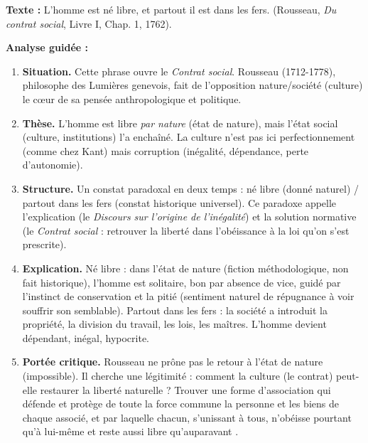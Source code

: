 \documentclass[11pt]{article}
\newcommand{\cle}[1]{{\popxbold\color{popdark}#1}}
\begin{document}
\begin{experience}
\textbf{Texte :} \guillemotleft L'homme est né libre, et partout il est dans les fers. \guillemotright (Rousseau, \emph{Du contrat social}, Livre I, Chap. 1, 1762).

\textbf{Analyse guidée :}
\begin{enumerate}
\item \textbf{Situation.} Cette phrase ouvre le \emph{Contrat social}. Rousseau (1712-1778), philosophe des Lumières genevois, fait de l'opposition nature/société (culture) le cœur de sa pensée anthropologique et politique.
\item \textbf{Thèse.} L'homme est libre \emph{par nature} (état de nature), mais l'état social (culture, institutions) l'a enchaîné. La culture n'est pas ici \guillemotleft perfectionnement \guillemotright (comme chez Kant) mais \guillemotleft corruption \guillemotright (inégalité, dépendance, perte d'autonomie).
\item \textbf{Structure.} Un constat paradoxal en deux temps : \guillemotleft né libre \guillemotright (donné naturel) / \guillemotleft partout dans les fers \guillemotright (constat historique universel). Ce paradoxe appelle l'explication (le \emph{Discours sur l'origine de l'inégalité}) et la solution normative (le \emph{Contrat social} : retrouver la liberté dans l'obéissance à la loi qu'on s'est prescrite).
\item \textbf{Explication.} \guillemotleft Né libre \guillemotright : dans l'état de nature (fiction méthodologique, non fait historique), l'homme est solitaire, bon par absence de vice, guidé par l'instinct de conservation et la \cle{pitié} (sentiment naturel de répugnance à voir souffrir son semblable). \guillemotleft Partout dans les fers \guillemotright : la société a introduit la propriété, la division du travail, les lois, les maîtres. L'homme devient dépendant, inégal, hypocrite.
\item \textbf{Portée critique.} Rousseau ne prône pas le retour à l'état de nature (impossible). Il cherche une \cle{légitimité} : comment la culture (le contrat) peut-elle restaurer la liberté naturelle ? \guillemotleft Trouver une forme d'association qui défende et protège de toute la force commune la personne et les biens de chaque associé, et par laquelle chacun, s'unissant à tous, n'obéisse pourtant qu'à lui-même et reste aussi libre qu'auparavant \guillemotright.
\end{enumerate}
\end{experience}
\end{document}
